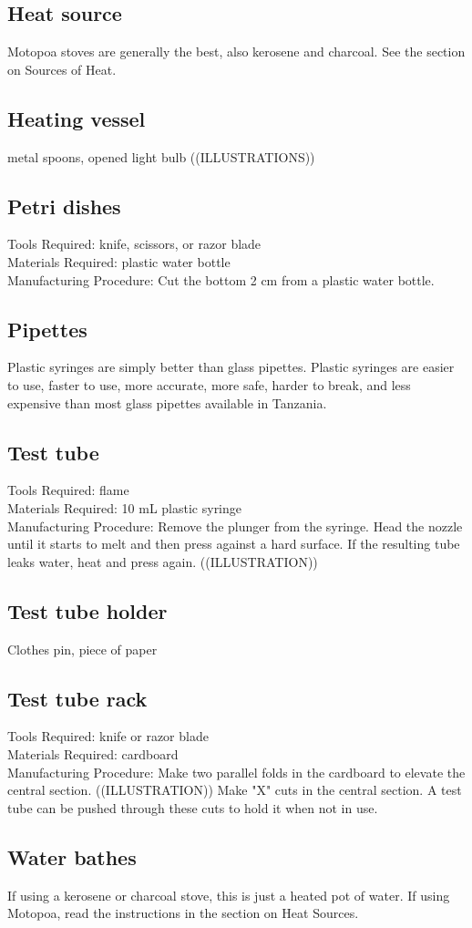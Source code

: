 \subsection{Heat source}
Motopoa stoves are generally the best, also kerosene and charcoal. See the section on Sources of Heat.

\subsection{Heating vessel}
metal spoons, opened light bulb ((ILLUSTRATIONS))

\subsection{Petri dishes}
Tools Required: knife, scissors, or razor blade\\
Materials Required: plastic water bottle\\
Manufacturing Procedure: Cut the bottom 2 cm from a plastic water bottle.

\subsection{Pipettes}
Plastic syringes are simply better than glass pipettes. Plastic syringes are easier to use, faster to use, more accurate, more safe, harder to break, and less expensive than most glass pipettes available in Tanzania.

\subsection{Test tube}
Tools Required: flame\\
Materials Required: 10 mL plastic syringe\\
Manufacturing Procedure: Remove the plunger from the syringe. Head the nozzle until it starts to melt and then press against a hard surface. If the resulting tube leaks water, heat and press again. ((ILLUSTRATION))

\subsection{Test tube holder}
Clothes pin, piece of paper

\subsection{Test tube rack}
Tools Required: knife or razor blade\\
Materials Required: cardboard\\
Manufacturing Procedure: Make two parallel folds in the cardboard to elevate the central section. ((ILLUSTRATION)) Make "X" cuts in the central section. A test tube can be pushed through these cuts to hold it when not in use.

\subsection{Water bathes}
If using a kerosene or charcoal stove, this is just a heated pot of water. If using Motopoa, read the instructions in the section on Heat Sources.